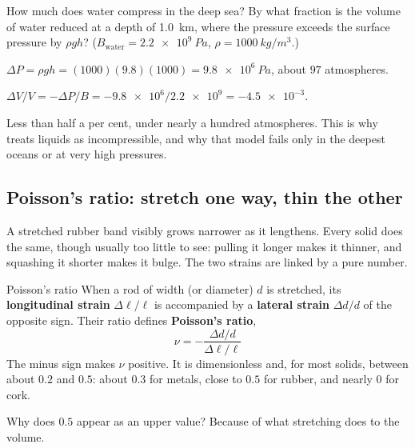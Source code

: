 \begin{exbox}{How much does water compress in the deep sea?}\label{ex:solids-water}
By what fraction is the volume of water reduced at a depth of \SI{1.0}{km}, where the pressure exceeds the
surface pressure by $\rho gh$? ($B_{\text{water}}=\SI{2.2e9}{Pa}$, $\rho=\SI{1000}{kg/m^3}$.)

 $\Delta P=\rho gh=(1000)(9.8)(1000)=\SI{9.8e6}{Pa}$, about $97$ atmospheres.

 $\Delta V/V=-\Delta P/B=-\num{9.8e6}/\num{2.2e9}=-\num{4.5e-3}$.

\smallskip
Less than half a per cent, under nearly a hundred atmospheres. This is why  treats
liquids as incompressible, and why that model fails only in the deepest oceans or at very high pressures.
\end{exbox}

\subsection{Poisson's ratio: stretch one way, thin the other}

A stretched rubber band visibly grows narrower as it lengthens. Every solid does the same, though usually
too little to see: pulling it longer makes it thinner, and squashing it shorter makes it bulge. The two
strains are linked by a pure number.

\begin{defbox}{Poisson's ratio}
When a rod of width (or diameter) $d$ is stretched, its \textbf{longitudinal strain} $\Delta\ell/\ell$ is
accompanied by a \textbf{lateral strain} $\Delta d/d$ of the opposite sign. Their ratio defines
\textbf{Poisson's ratio},
\[
\boxed{\;\nu=-\frac{\Delta d/d}{\Delta\ell/\ell}\;}
\]
The minus sign makes $\nu$ positive. It is dimensionless and, for most solids, between about $0.2$ and
$0.5$: about $0.3$ for metals, close to $0.5$ for rubber, and nearly $0$ for cork.
\end{defbox}

Why does $0.5$ appear as an upper value? Because of what stretching does to the volume.


